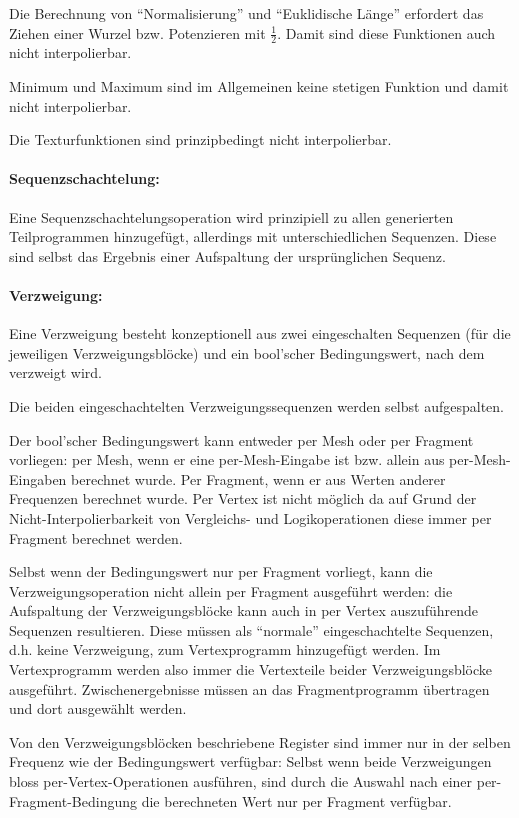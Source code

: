 \documentclass[twoside,a4paper,fleqn,12pt]{article}
\begin{document}
Die Berechnung von "`Normalisierung"' und "`Euklidische Länge"' erfordert das Ziehen einer Wurzel bzw. Potenzieren mit $\frac{1}{2}$.
Damit sind diese Funktionen auch nicht interpolierbar.

Minimum und Maximum sind im Allgemeinen keine stetigen Funktion und damit nicht interpolierbar.

Die Texturfunktionen sind prinzipbedingt nicht interpolierbar.

\paragraph{Sequenzschachtelung:} Eine Sequenzschachtelungsoperation wird prinzipiell zu allen generierten Teilprogrammen hinzugefügt,
allerdings mit unterschiedlichen Sequenzen. Diese sind selbst das Ergebnis einer Aufspaltung der ursprünglichen Sequenz.

\paragraph{Verzweigung:} Eine Verzweigung besteht konzeptionell aus zwei eingeschalten Sequenzen (für die jeweiligen Verzweigungsblöcke)
und ein bool'scher Bedingungswert, nach dem verzweigt wird.

Die beiden eingeschachtelten Verzweigungssequenzen werden selbst aufgespalten.

Der bool'scher Bedingungswert kann entweder per Mesh oder per Fragment vorliegen: per Mesh, wenn er eine per-Mesh-Eingabe ist bzw. allein aus
per-Mesh-Eingaben berechnet wurde. Per Fragment, wenn er aus Werten anderer Frequenzen berechnet wurde. Per Vertex ist nicht
möglich da auf Grund der Nicht-Interpolierbarkeit von Vergleichs- und Logikoperationen diese immer per Fragment berechnet werden.

Selbst wenn der Bedingungswert nur per Fragment vorliegt, kann die Verzweigungsoperation nicht allein per Fragment ausgeführt werden:
die Aufspaltung der Verzweigungsblöcke kann auch in per Vertex auszuführende Sequenzen resultieren. Diese müssen als "`normale"'
eingeschachtelte Sequenzen, d.h. keine Verzweigung, zum Vertexprogramm hinzugefügt werden. Im Vertexprogramm werden also immer
die Vertexteile beider Verzweigungsblöcke ausgeführt. Zwischenergebnisse müssen an das Fragmentprogramm übertragen und dort ausgewählt werden.

Von den Verzweigungsblöcken beschriebene Register sind immer nur in der selben Frequenz wie der Bedingungswert verfügbar:
Selbst wenn beide Verzweigungen bloss per-Vertex-Operationen ausführen, sind durch die Auswahl nach einer per-Fragment-Bedingung
die berechneten Wert nur per Fragment verfügbar.
\end{document}
